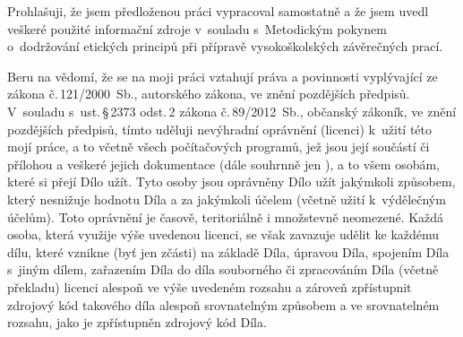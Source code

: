 \documentclass[english,master,unicode,bw]{ctufit-thesis}
\begin{document}
\begin{declarationpage}
Prohlašuji, že jsem předloženou práci vypracoval samostatně a že jsem uvedl veškeré
použité informační zdroje v~souladu s~Metodickým pokynem o~do\-držo\-vání etických
principů při přípravě vysokoškolských závěrečných prací.

Beru na vědomí, že se na moji práci vztahují práva a povinnosti vy\-plý\-va\-jící ze zákona
č.\,121/2000~Sb., autorského zákona, ve znění pozdějších předpisů. V~souladu s~ust.\,§\,2373 odst.\,2 zákona č.\,89/2012~Sb., občanský zákoník, ve znění pozdějších předpisů,
tímto uděluji nevýhradní oprávnění (licenci) k~užití této mojí práce, a to včetně všech 
počítačových programů, jež jsou její součástí či přílohou a veškeré jejich
dokumentace (dále souhrnně jen ), a to všem osobám, které si přejí Dílo užít.
Tyto osoby jsou oprávněny Dílo užít jakýmkoli způsobem, který nesnižuje hodnotu
Díla a za jakýmkoli účelem (včetně užití k~výdělečným účelům). Toto oprávnění je
časově, teritoriálně i množstevně neomezené. Každá osoba, která využije výše
uvedenou licenci, se však zavazuje udělit ke každému dílu, které vznikne (byť jen
zčásti) na základě Díla, úpravou Díla, spojením Díla s~jiným dílem, zařazením Díla
do díla souborného či zpracováním Díla (včetně překladu) licenci alespoň ve výše
uvedeném rozsahu a zároveň zpřístupnit zdrojový kód takového díla alespoň
srovnatelným způsobem a ve srovnatelném rozsahu, jako je zpřístupněn zdrojový
kód Díla.
\end{declarationpage}

\printabstractpage %


\mainmatter\mainmatterinit %









\appendix\appendixinit %


\backmatter %

\printbibliography %

\end{document}
